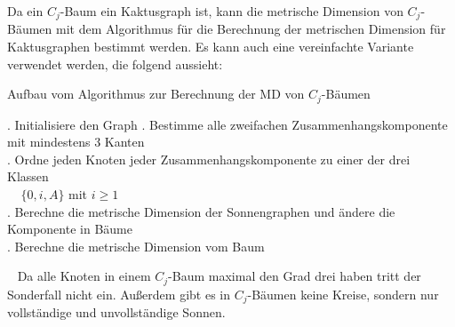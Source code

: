 \begin{bem}
Da ein $C_j$-Baum ein Kaktusgraph ist, kann die metrische Dimension von $C_j$-Bäumen mit dem Algorithmus für die Berechnung der metrischen Dimension für Kaktusgraphen bestimmt werden. Es kann auch eine vereinfachte Variante verwendet werden, die folgend aussieht:\newline
\begin{algorithm}
\caption{Aufbau vom Algorithmus zur Berechnung der MD von $C_j$-Bäumen}
\begin{algorithmic}
\vspace{2mm}
. Initialisiere den Graph
\vspace{2mm}
. Bestimme alle zweifachen Zusammenhangskomponente mit mindestens 3 Kanten\\
\vspace{2mm}
. Ordne jeden Knoten jeder Zusammenhangskomponente zu einer der drei Klassen\\$\;\;\;\;\{0,i,A\}$ mit $i \geq 1$\\
\vspace{2mm}
. Berechne die metrische Dimension der Sonnengraphen und ändere die Komponente in Bäume\\
\vspace{2mm}
. Berechne die metrische Dimension vom Baum
\vspace{2mm}
\end{algorithmic}
\end{algorithm}
~\linebreak
Da alle Knoten in einem $C_j$-Baum maximal den Grad drei haben tritt der Sonderfall nicht ein. Außerdem gibt es in $C_j$-Bäumen keine Kreise, sondern nur vollständige und unvollständige Sonnen.

\end{bem}
